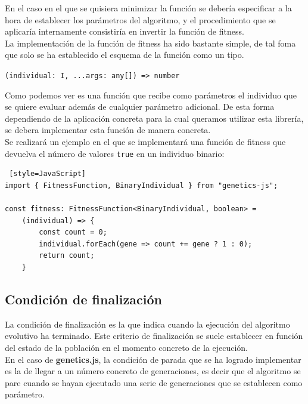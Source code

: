 En el caso en el que se quisiera minimizar la función se debería especificar a la hora de establecer los parámetros del algoritmo, y el procedimiento que se aplicaría internamente consistiría en invertir la función de fitness. \\

La implementación de la función de fitness ha sido bastante simple, de tal foma que solo se ha establecido el esquema de la función como un tipo.

\begin{center}
    \texttt{(individual: I, ...args: any[]) => number}
\end{center}

Como podemos ver es una función que recibe como parámetros el individuo que se quiere evaluar además de cualquier parámetro adicional. De esta forma dependiendo de la aplicación concreta para la cual queramos utilizar esta librería, se debera implementar esta función de manera concreta.\\

Se realizará un ejemplo en el que se implementará una función de fitness que devuelva el número de valores \texttt{true} en un individuo binario: \\

\begin{lstlisting} [style=JavaScript]
import { FitnessFunction, BinaryIndividual } from "genetics-js";

const fitness: FitnessFunction<BinaryIndividual, boolean> = 
    (individual) => {
        const count = 0;
        individual.forEach(gene => count += gene ? 1 : 0);
        return count;
    }
\end{lstlisting}

\subsection{Condición de finalización}

La condición de finalización es la que indica cuando la ejecución del algoritmo evolutivo ha terminado. Este criterio de finalización se suele establecer en función del estado de la población en el momento concreto de la ejecución. \\

En el caso de \textbf{genetics.js}, la condición de parada que se ha logrado implementar es la de llegar a un número concreto de generaciones, es decir que el algoritmo se pare cuando se hayan ejecutado una serie de generaciones que se establecen como parámetro. \\

